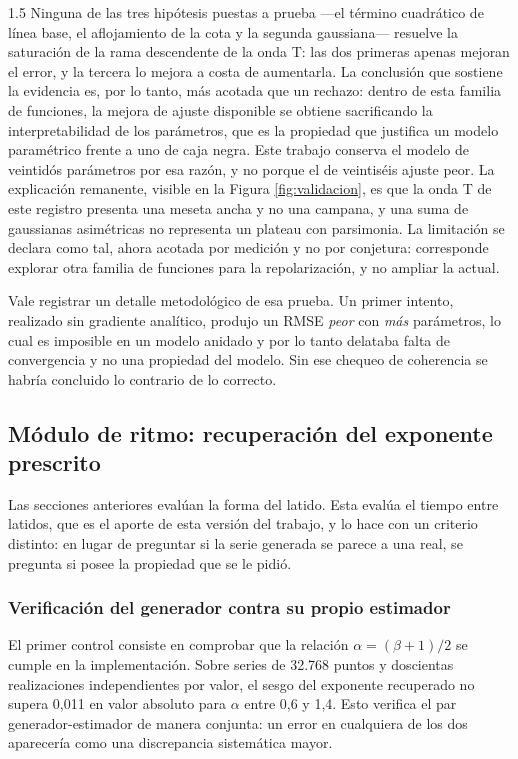 \begin{spacing}{1.5}
Ninguna de las tres hipótesis puestas a prueba —el término cuadrático de línea base, el aflojamiento de la cota y la segunda gaussiana— resuelve la saturación de la rama descendente de la onda T: las dos primeras apenas mejoran el error, y la tercera lo mejora a costa de aumentarla. La conclusión que sostiene la evidencia es, por lo tanto, más acotada que un rechazo: dentro de esta familia de funciones, la mejora de ajuste disponible se obtiene sacrificando la interpretabilidad de los parámetros, que es la propiedad que justifica un modelo paramétrico frente a uno de caja negra. Este trabajo conserva el modelo de veintidós parámetros por esa razón, y no porque el de veintiséis ajuste peor. La explicación remanente, visible en la Figura \ref{fig:validacion}, es que la onda T de este registro presenta una meseta ancha y no una campana, y una suma de gaussianas asimétricas no representa un plateau con parsimonia. La limitación se declara como tal, ahora acotada por medición y no por conjetura: corresponde explorar otra familia de funciones para la repolarización, y no ampliar la actual.

Vale registrar un detalle metodológico de esa prueba. Un primer intento, realizado sin gradiente analítico, produjo un RMSE \emph{peor} con \emph{más} parámetros, lo cual es imposible en un modelo anidado y por lo tanto delataba falta de convergencia y no una propiedad del modelo. Sin ese chequeo de coherencia se habría concluido lo contrario de lo correcto.

\subsection{Módulo de ritmo: recuperación del exponente prescrito}

Las secciones anteriores evalúan la forma del latido. Esta evalúa el tiempo
entre latidos, que es el aporte de esta versión del trabajo, y lo hace con un
criterio distinto: en lugar de preguntar si la serie generada se parece a una
real, se pregunta si posee la propiedad que se le pidió.

\subsubsection{Verificación del generador contra su propio estimador}

El primer control consiste en comprobar que la relación
$\alpha = (\beta+1)/2$ se cumple en la implementación. Sobre series de 32.768
puntos y doscientas realizaciones independientes por valor, el sesgo del
exponente recuperado no supera 0,011 en valor absoluto para $\alpha$ entre 0,6
y 1,4. Esto verifica el par generador-estimador de manera conjunta: un error en
cualquiera de los dos aparecería como una discrepancia sistemática mayor.


\end{spacing}
